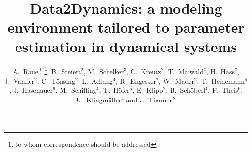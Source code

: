 \documentclass{bioinfo}
\begin{document}

\title[Data2Dynamics]{Data2Dynamics: a modeling environment tailored to parameter 
estimation in dynamical systems}
\author[A.~Raue \textit{et~al.}]{A.~Raue\,$^{1,}$\footnote{to whom correspondence 
should be addressed}, B.~Steiert$^{2}$, M.~Schelker$^{3}$, C.~Kreutz$^{2}$, T.~Maiwald$^{2}$, H.~Hass$^{2}$, J.~Vanlier$^{2}$, C.~T\"onsing$^{2}$, L.~Adlung$^{4}$, R.~Engesser$^{2}$, W.~Mader$^{2}$, T.~Heinemann$^{5}$, J.~Hasenauer$^{6}$, M.~Schilling$^{4}$, T.~H\"ofer$^{5}$, E.~Klipp$^{2}$, B.~Sch\"oberl$^{1}$, F.~Theis$^{6}$, U.~Klingm\"uller$^{4}$ and J.~Timmer\,$^{2}$}
\address{$^{1}$Merrimack Pharmaceuticals Inc., 02139 Cambridge, MA, USA\\
$^{2}$University of Freiburg, Institute for Physics, 79104 Freiburg, Germany\\
$^{3}$Humboldt-Universit\"at zu Berlin, Theoretical Biophysics, 10115 Berlin, Germany\\
$^{4}$German Cancer Research Center, 69120 Heidelberg, Germany.\\
$^{5}$BioQuant, University of Heidelberg, 69120 Freiburg, Germany\\
$^{6}$Helmholtz Center Munich, 85764 Neuherberg, Germany.}



\maketitle
\end{document}
